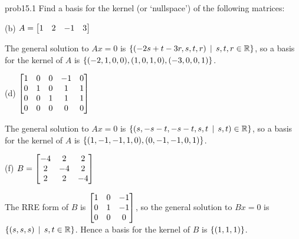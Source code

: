 \begin{sol}{prob15.1} Find a basis for the kernel (or `nullspace') of the following matrices:

(b) $A=\bmatrix  1 & 2 & -1 & 3 \endbmatrix$

\soln The general solution to $Ax=0$ is $\{(-2s+t-3r,s,t,r)\,\mid \, s,t,r\in \mathbb{R} \}$, so a basis for the kernel of $A$ is $\{(-2,1,0,0), (1,0,1,0),(-3,0,0,1) \} $.
\medskip

(d) $ \bmatrix 
1& 0& 0& -1& 0\\  
0& 1& 0& 1&1\\ 
0& 0& 1& 1& 1\\ 
0& 0& 0& 0& 0\endbmatrix$

\soln The general solution to $Ax=0$ is $\{(s,-s-t,-s-t,s,t\,\mid \, s,t)\in \mathbb{R} \}$, so a basis for the kernel of $A$ is $\{(1,-1,-1,1,0), (0,-1,-1,0,1) \} $.
\medskip
%

(f)  $B=\bmatrix
-4&2&2\\ 2&-4&2\\ 2&2&-4 \endbmatrix$

\soln The RRE form of $B$ is $\bmatrix 1 & 0 & -1 \\
 0 & 1 & -1 \\
 0 & 0 & 0 \endbmatrix$, so the general solution to $Bx=0$ is $\{(s,s,s)\,\mid \, s,t\in \mathbb{R} \}$. Hence a basis for the kernel of $B$ is $\{(1,1,1) \} $.
\medskip
\end{sol}

